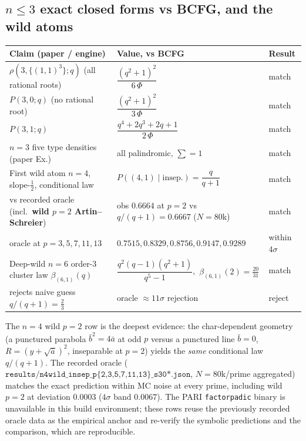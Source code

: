 \documentclass[11pt]{article}
\newcommand{\code}[1]{\texttt{#1}}
\begin{document}
\subsection{$n\le3$ exact closed forms vs BCFG, and the wild atoms}

\begin{longtable}{@{}p{}p{}p{}@{}}
\toprule
\textbf{Claim (paper / engine)} & \textbf{Value, vs BCFG} & \textbf{Result} \\
\midrule
\endhead
$\rho(3,\{(1,1)^3\};q)$ (all rational roots) & $\dfrac{(q^2+1)^2}{6\,\Phi}$ &
match \\
$P(3,0;q)$ (no rational root) & $\dfrac{(q^2+1)^2}{3\,\Phi}$ & match \\
$P(3,1;q)$ & $\dfrac{q^4+2q^3+2q+1}{2\,\Phi}$ & match \\
$n=3$ five type densities (paper Ex.) & all palindromic, $\sum=1$ & match \\
First wild atom $n=4$, slope-$\tfrac12$, conditional law &
$P((4,1)\mid\text{insep.})=\dfrac{q}{q+1}$ & match \\
\quad vs recorded oracle (incl.\ \textbf{wild $p=2$ Artin--Schreier}) &
obs $0.6664$ at $p{=}2$ vs $q/(q{+}1)=0.6667$ ($N{=}80$k) & match \\
\quad oracle at $p=3,5,7,11,13$ & $0.7515,0.8329,0.8756,0.9147,0.9289$ &
within $4\sigma$ \\
Deep-wild $n=6$ order-$3$ cluster law $\beta_{(6,1)}(q)$ &
$\dfrac{q^2(q-1)(q^2+1)}{q^5-1}$,\ $\beta_{(6,1)}(2)=\tfrac{20}{31}$ & match \\
\quad rejects naive guess $q/(q{+}1)=\tfrac23$ & oracle $\approx 11\sigma$ rejection
& reject \\
\bottomrule
\end{longtable}

\noindent The $n=4$ wild $p=2$ row is the deepest evidence: the char-dependent geometry
(a punctured parabola $\bar b^2=4\bar a$ at odd $p$ versus a punctured line $\bar b=0$,
$R=(y+\sqrt{\bar a})^2$, inseparable at $p=2$) yields the \emph{same} conditional law
$q/(q+1)$. The recorded oracle ($\code{results/n4wild\_insep\_p\{2,3,5,7,11,13\}\_s30*.json}$,
$N=80$k/prime aggregated) matches the exact prediction within MC noise at every prime,
including wild $p=2$ at deviation $0.0003$ ($4\sigma$ band $0.0067$). The
PARI \code{factorpadic} binary is unavailable in this build environment; these rows reuse
the previously recorded oracle data as the empirical anchor and re-verify the symbolic
predictions and the comparison, which are reproducible.
\end{document}
